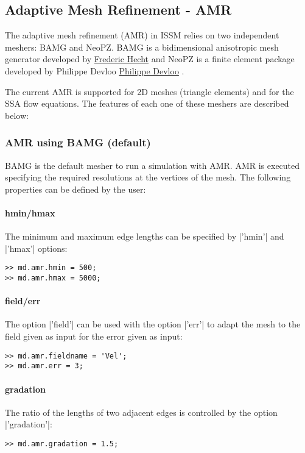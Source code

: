 
\subsection{Adaptive Mesh Refinement - AMR} \label{sec:using-issm-advanced-amr}
The adaptive mesh refinement (AMR) in ISSM relies on two independent meshers: BAMG and NeoPZ. BAMG is a bidimensional anisotropic mesh generator developed by \href{http://www.ann.jussieu.fr/~hecht/}{Frederic Hecht} \citep{Hecht2006} and NeoPZ is a finite element package developed by Philippe Devloo \href{https://github.com/labmec/neopz}{Philippe Devloo} \cite{Devloo1997}.

The current AMR is supported for 2D meshes (triangle elements) and for the SSA flow equations. The
features of each one of these meshers are described below:

\subsubsection{AMR using BAMG (default)}%
BAMG is the default mesher to run a simulation with AMR. AMR is executed specifying the required resolutions at the vertices of the mesh. The following properties can be defined by the user:

\paragraph{hmin/hmax}
The minimum and maximum edge lengths can be specified by \lstinlinebg|'hmin'| and \lstinlinebg|'hmax'| options:
\begin{lstlisting}
>> md.amr.hmin = 500;
>> md.amr.hmax = 5000;
\end{lstlisting}

\paragraph{field/err}
The option \lstinlinebg|'field'| can be used with the option \lstinlinebg|'err'| to adapt the mesh to the field given as input for the error given as input:
\begin{lstlisting}
>> md.amr.fieldname = 'Vel';
>> md.amr.err = 3;
\end{lstlisting}

\paragraph{gradation}
The ratio of the lengths of two adjacent edges is controlled by the option \lstinlinebg|'gradation'|:
\begin{lstlisting}
>> md.amr.gradation = 1.5;
\end{lstlisting}

